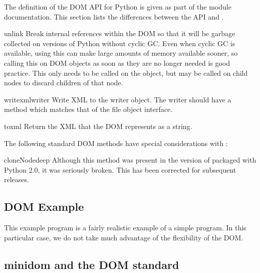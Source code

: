 The definition of the DOM API for Python is given as part of the
 module documentation.  This section lists the
differences between the API and .


\begin{methoddesc}{unlink}{}
Break internal references within the DOM so that it will be garbage
collected on versions of Python without cyclic GC.  Even when cyclic
GC is available, using this can make large amounts of memory available
sooner, so calling this on DOM objects as soon as they are no longer
needed is good practice.  This only needs to be called on the
 object, but may be called on child nodes to discard
children of that node.
\end{methoddesc}

\begin{methoddesc}{writexml}{writer}
Write XML to the writer object.  The writer should have a
 method which matches that of the file object
interface.
\end{methoddesc}

\begin{methoddesc}{toxml}{}
Return the XML that the DOM represents as a string.
\end{methoddesc}

The following standard DOM methods have special considerations with
:

\begin{methoddesc}{cloneNode}{deep}
Although this method was present in the version of
 packaged with Python 2.0, it was seriously
broken.  This has been corrected for subsequent releases.
\end{methoddesc}


\subsection{DOM Example \label{dom-example}}

This example program is a fairly realistic example of a simple
program. In this particular case, we do not take much advantage
of the flexibility of the DOM.




\subsection{minidom and the DOM standard \label{minidom-and-dom}}

